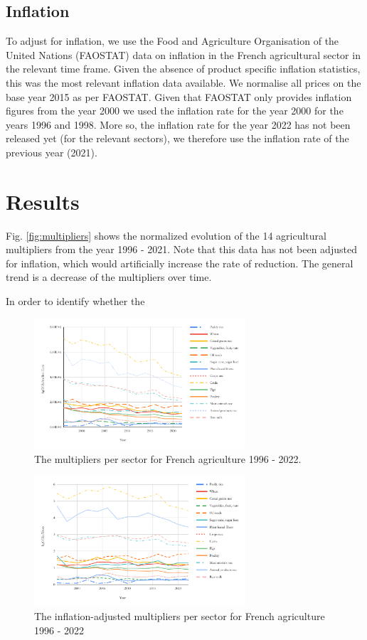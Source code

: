 \documentclass[a4paper,twoside]{article}
\begin{document}
\subsection{Inflation}

To adjust for inflation, we use the Food and Agriculture Organisation of the United Nations (FAOSTAT) data on inflation in the French agricultural sector in the relevant time frame. Given the absence of product specific inflation statistics, this was the most relevant inflation data available. We normalise all prices on the base year 2015 as per FAOSTAT. Given that FAOSTAT only provides inflation figures from the year 2000 we used the inflation rate for the year 2000 for the years 1996 and 1998. More so, the inflation rate for the year 2022 has not been released yet (for the relevant sectors), we therefore use the inflation rate of the previous year (2021).

\section{Results}

Fig. \ref{fig:multipliers} shows the normalized evolution of the 14 agricultural multipliers from the year 1996 - 2021. Note that this data has not been adjusted for inflation, which would artificially increase the rate of reduction. The general trend is a decrease of the multipliers over time.

In order to identify whether the 

\begin{figure}[H]
\centering
\includegraphics[width=0.7\textwidth]{raw_multipliers}
\caption{The multipliers per sector for French agriculture 1996 - 2022.}\label{fig:rawmultipliers} 
\end{figure}


\begin{figure}[H]
\centering
\includegraphics[width=0.7\textwidth]{inflated_adjusted}
\caption{The inflation-adjusted multipliers per sector for French agriculture 1996 - 2022}\label{fig:adjustedmultipliers} 
\end{figure}
\end{document}
